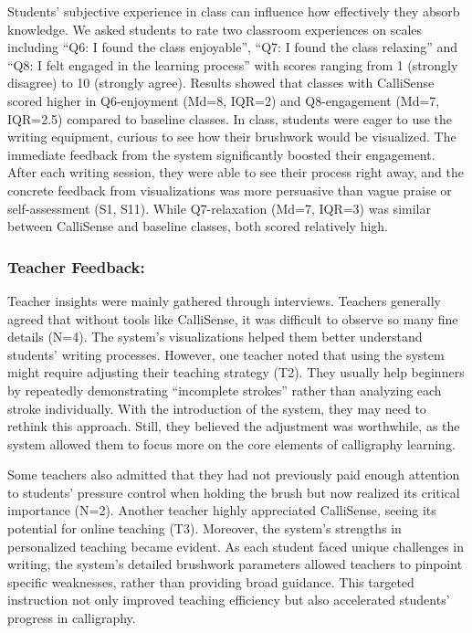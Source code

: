 Students' subjective experience in class can influence how effectively they absorb knowledge. We asked students to rate two classroom experiences on scales including ``Q6: I found the class enjoyable'', ``Q7: I found the class relaxing'' and ``Q8: I felt engaged in the learning process'' with scores ranging from 1 (strongly disagree) to 10 (strongly agree). Results showed that classes with CalliSense scored higher in Q6-enjoyment (Md=8, IQR=2) and Q8-engagement (Md=7, IQR=2.5) compared to baseline classes. In class, students were eager to use the writing equipment, curious to see how their brushwork would be visualized. The immediate feedback from the system significantly boosted their engagement. After each writing session, they were able to see their process right away, and the concrete feedback from visualizations was more persuasive than vague praise or self-assessment (S1, S11). While Q7-relaxation (Md=7, IQR=3) was similar between CalliSense and baseline classes, both scored relatively high.

\subsubsection{Teacher Feedback:}

Teacher insights were mainly gathered through interviews. Teachers generally agreed that without tools like CalliSense, it was difficult to observe so many fine details (N=4). The system's visualizations helped them better understand students' writing processes. However, one teacher noted that using the system might require adjusting their teaching strategy (T2). They usually help beginners by repeatedly demonstrating ``incomplete strokes'' rather than analyzing each stroke individually. With the introduction of the system, they may need to rethink this approach. Still, they believed the adjustment was worthwhile, as the system allowed them to focus more on the core elements of calligraphy learning.

Some teachers also admitted that they had not previously paid enough attention to students' pressure control when holding the brush but now realized its critical importance (N=2). Another teacher highly appreciated CalliSense, seeing its potential for online teaching (T3). Moreover, the system's strengths in personalized teaching became evident. As each student faced unique challenges in writing, the system's detailed brushwork parameters allowed teachers to pinpoint specific weaknesses, rather than providing broad guidance. This targeted instruction not only improved teaching efficiency but also accelerated students' progress in calligraphy.

 
